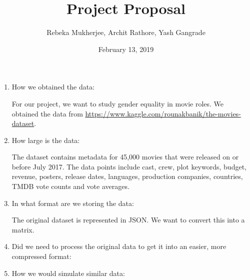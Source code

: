 \documentclass[11pt]{article}
\title{Project Proposal}
\author{Rebeka Mukherjee, Archit Rathore, Yash Gangrade}
\date{February 13, 2019}
\begin{document}
\maketitle

\begin{enumerate}

\item How we obtained the data:

For our project, we want to study gender equality in movie roles. We obtained the data from \url{https://www.kaggle.com/rounakbanik/the-movies-dataset}.

\item How large is the data:

The dataset contains metadata for 45,000 movies that were released on or before July 2017. The data points include cast, crew, plot keywords, budget, revenue, posters, release dates, languages, production companies, countries, TMDB vote counts and vote averages.

\item In what format are we storing the data:

The original dataset is represented in JSON. We want to convert this into a matrix.


\item Did we need to process the original data to get it into an easier, more compressed format:


\item How we would simulate similar data:

\end{enumerate}
\end{document}
